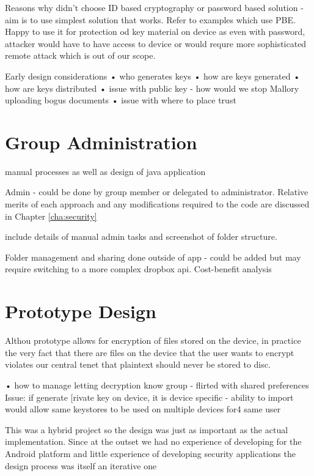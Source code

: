 Reasons why didn't choose ID based cryptography or password based solution - aim is to use simplest solution that works.  Refer to examples which use PBE.  Happy to use it for protection od key material on device as even with password, attacker would have to have access to device or would requre more sophisticated remote attack which is out of our scope.  


Early design considerations 
• who generates keys
• how are keys generated
• how are keys distributed
• issue with public key - how would we stop Mallory uploading bogus documents
• issue with where to place trust

\section{Group Administration}
manual processes as well as design of java application

Admin - could be done by group member or delegated to administrator. Relative merits of each approach and any modifications required to the code are discussed in Chapter \ref{cha:security} 

include details of manual admin tasks and screenshot of folder structure.

Folder management and sharing done outside of app - could be added but may require switching to a more complex dropbox api.  Cost-benefit analysis

\section{Prototype Design}


Althou prototype allows for encryption of files stored on the device, in practice the very fact that there are files on the device that the user wants to encrypt violates our central tenet that plaintext should never be stored to disc. 


• how to manage letting decryption know group - flirted with shared preferences
Issue: if generate [rivate key on device, it is device specific - ability to import would allow same keystores to be used on multiple devices for4 same user



This was a hybrid project so the design was just as important as the actual implementation.  Since at the outset we had no experience of developing for the Android platform and little experience of developing security applications the design process was itself an iterative one

